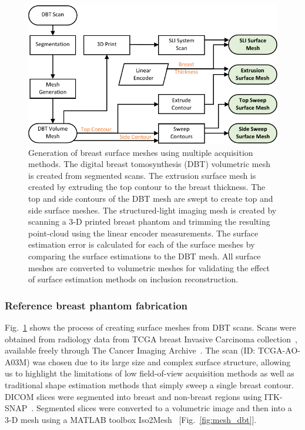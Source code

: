 \begin{figure}
    \begin{center}
    \includegraphics[width=.9\textwidth]{fig/omci/mesh_flowchart2.pdf}
    \end{center}
    \caption{Generation of breast surface meshes using multiple acquisition methods. The digital breast tomosynthesis (DBT) volumetric mesh is created from segmented scans. The extrusion surface mesh is created by extruding the top contour to the breast thickness. The top and side contours of the DBT mesh are swept to create top and side surface meshes. The structured-light imaging mesh is created by scanning a 3-D printed breast phantom and trimming the resulting point-cloud using the linear encoder measurements. The surface estimation error is calculated for each of the surface meshes by comparing the surface estimations to the DBT mesh. All surface meshes are converted to volumetric meshes for validating the effect of surface estimation methods on inclusion reconstruction.}
    \label{fig:mesh_flowchart}
\end{figure} 

\subsubsection{Reference breast phantom fabrication}
Fig.~\ref{fig:mesh_flowchart} shows the process of creating surface meshes from \ac{DBT} scans. Scans were obtained from radiology data from \ac{TCGA} breast Invasive Carcinoma collection~\cite{Lingle2016}, available freely through The Cancer Imaging Archive~\cite{Clark2013}. The scan (ID: TCGA-AO-A03M) was chosen due to its large size and complex surface structure, allowing us to highlight the limitations of low field-of-view acquisition methods as well as traditional shape estimation methods that simply sweep a single breast contour. \ac{DICOM} slices were segmented into breast and non-breast regions using ITK-SNAP~\cite{Yushkevich2006}. Segmented slices were converted to a volumetric image and then into a 3-D mesh using a MATLAB toolbox Iso2Mesh~\cite{Fang2009} [Fig.~\ref{fig:mesh_dbt}].

